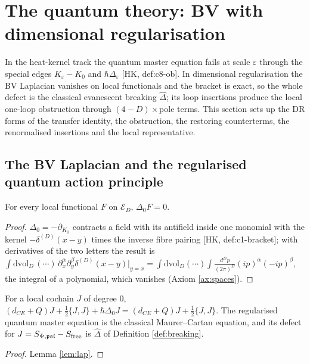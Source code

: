 
\section{The quantum theory: BV with dimensional regularisation}
\label{sec:quantum}

In the heat-kernel track the quantum master equation fails at scale $\varepsilon$ through the special edges $K_\varepsilon-K_0$ and $\hbar\Delta_\varepsilon$ [HK, def:c8-ob]. In dimensional regularisation the BV Laplacian vanishes on local functionals and the bracket is exact, so the whole defect is the classical evanescent breaking $\widehat\Delta$; its loop insertions produce the local one-loop obstruction through $(4-D)\times$pole terms. This section sets up the DR forms of the transfer identity, the obstruction, the restoring counterterms, the renormalised insertions and the local representative.

\subsection{The BV Laplacian and the regularised quantum action principle}

\begin{lemma}
\label{lem:lap}
For every local functional $F$ on $\mathscr E_D$, $\Delta_0F=0$.
\end{lemma}

\begin{proof}
$\Delta_0=-\partial_{K_0}$ contracts a field with its antifield inside one monomial with the kernel $-\delta^{(D)}(x-y)$ times the inverse fibre pairing [HK, def:c1-bracket]; with derivatives of the two letters the result is $\int\mathrm{dvol}_D\,(\cdots)\,\partial^\alpha_x\partial^\beta_y\delta^{(D)}(x-y)|_{y=x}=\int\mathrm{dvol}_D(\cdots)\int\frac{d^Dp}{(2\pi)^D}(ip)^\alpha(-ip)^\beta$, the integral of a polynomial, which vanishes (Axiom \ref{ax:spaces}).
\end{proof}

\begin{theorem}
\label{thm:qme}
For a local cochain $J$ of degree $0$, $(d_{CE}+Q)J+\frac12\{J,J\}+\hbar\Delta_0J=(d_{CE}+Q)J+\frac12\{J,J\}$. The regularised quantum master equation is the classical Maurer--Cartan equation, and its defect for $J=S_{\Psi,\mathfrak{psl}}-S_{\rm free}$ is $\widehat\Delta$ of Definition \ref{def:breaking}.
\end{theorem}

\begin{proof}
Lemma \ref{lem:lap}.
\end{proof}

